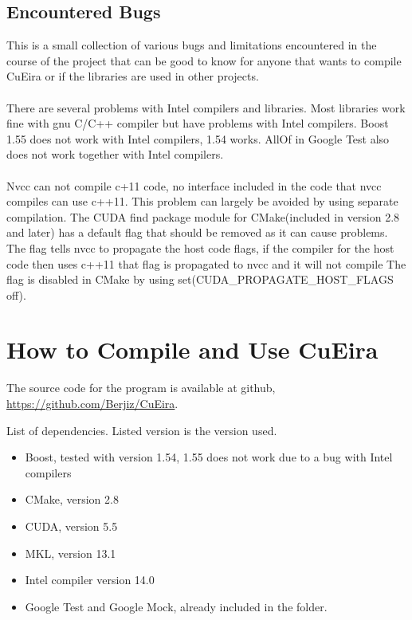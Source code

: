 \documentclass[10pt,a4paper]{report}
\begin{document}
\begin{appendices}
\section{Encountered Bugs}
\label{found_bugs}
This is a small collection of various bugs and limitations encountered in the course of the project that can be good to know for anyone that wants to compile CuEira or if the libraries are used in other projects.\\
\\
There are several problems with Intel compilers and libraries. Most libraries work fine with gnu C/C++ compiler but have problems with Intel compilers. Boost 1.55 does not work with Intel compilers, 1.54 works. AllOf in Google Test also does not work together with Intel compilers.\\
\\
Nvcc can not compile c+11 code, no interface included in the code that nvcc compiles can use c++11. This problem can largely be avoided by using separate compilation. The CUDA find package module for CMake(included in version 2.8 and later) has a default flag that should be removed as it can cause problems. The flag tells nvcc to propagate the host code flags, if the compiler for the host code then uses c++11 that flag is propagated to nvcc and it will not compile The flag is disabled in CMake by using set(CUDA\_PROPAGATE\_HOST\_FLAGS off).

\chapter{How to Compile and Use CuEira}
\label{compile_cueira}
The source code for the program is available at github, \url{https://github.com/Berjiz/CuEira}.

\begin{description}
    \item[List of dependencies. Listed version is the version used.]
\end{description}
\begin{itemize}
 \item Boost, tested with version 1.54, 1.55 does not work due to a bug with Intel compilers
 \item CMake, version 2.8
 \item CUDA, version 5.5
 \item MKL, version 13.1
 \item Intel compiler version 14.0
 \item Google Test and Google Mock, already included in the folder.
\end{itemize}


\end{appendices}
\end{document}
